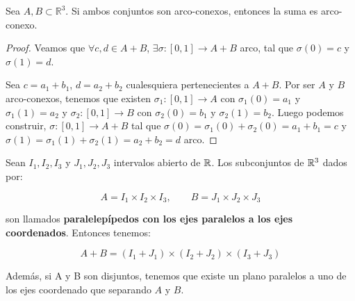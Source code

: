 \begin{lemma}
Sea $A,B \subset \mathbb{R}^3$. Si ambos conjuntos son arco-conexos, entonces la suma es arco-conexo.
\end{lemma}
\begin{proof}
Veamos que $\forall c,d \in A+B$, $\exists \sigma: [0,1] \longrightarrow A+B$ arco, tal que $\sigma(0)=c$ y $\sigma(1)=d$.

Sea $c=a_1 + b_1$, $d=a_2+b_2$ cualesquiera pertenecientes a $A+B$. Por ser $A$ y $B$ arco-conexos, tenemos que existen $\sigma_1: [0,1] \longrightarrow A$ con $\sigma_1(0)=a_1$ y $\sigma_1(1)=a_2$ y $\sigma_2: [0,1] \longrightarrow B$ con $\sigma_2(0)=b_1$ y $\sigma_2(1)=b_2$. Luego podemos construir, $\sigma: [0,1] \longrightarrow A+B$ tal que $\sigma(0)=\sigma_1(0) + \sigma_2(0) = a_1+b_1 = c$ y $\sigma(1)=\sigma_1(1) + \sigma_2(1) = a_2+b_2 = d$ arco.
\end{proof}

\begin{lemma}\label{paralelepipedoslemma}
Sean $I_1, I_2, I_3$ y $J_1, J_2, J_3$ intervalos abierto de $\mathbb{R}$. Los subconjuntos de $\mathbb{R}^3$ dados por:

\begin{equation*}
    A = I_1 \times I_2 \times I_3, \qquad B = J_1 \times J_2 \times J_3
\end{equation*}

son llamados \textbf{paralelepípedos con los ejes paralelos a los ejes coordenados}. Entonces tenemos:

\begin{equation*}
    A + B = (I_1 + J_1) \times (I_2 + J_2) \times (I_3 + J_3)
\end{equation*}

Además, si A y B son disjuntos, tenemos que existe un plano paralelos a uno de los ejes coordenado que separando $A$ y $B$.
\end{lemma}

